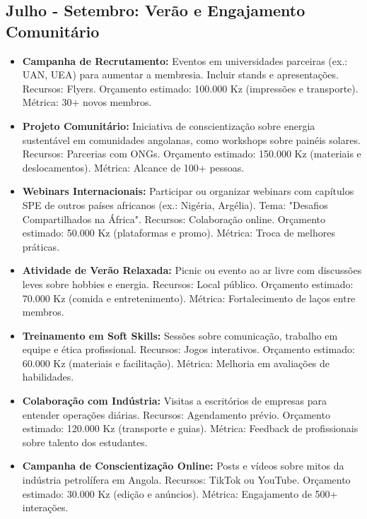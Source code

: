 \documentclass[12pt]{article}
\begin{document}
\subsection{Julho - Setembro: Verão e Engajamento Comunitário}
\begin{itemize}
    \item \textbf{Campanha de Recrutamento:} Eventos em universidades parceiras (ex.: UAN, UEA) para aumentar a membresia. Incluir stands e apresentações. Recursos: Flyers. Orçamento estimado: 100.000 Kz (impressões e transporte). Métrica: 30+ novos membros.
    \item \textbf{Projeto Comunitário:} Iniciativa de conscientização sobre energia sustentável em comunidades angolanas, como workshops sobre painéis solares. Recursos: Parcerias com ONGs. Orçamento estimado: 150.000 Kz (materiais e deslocamentos). Métrica: Alcance de 100+ pessoas.
    \item \textbf{Webinars Internacionais:} Participar ou organizar webinars com capítulos SPE de outros países africanos (ex.: Nigéria, Argélia). Tema: "Desafios Compartilhados na África". Recursos: Colaboração online. Orçamento estimado: 50.000 Kz (plataformas e promo). Métrica: Troca de melhores práticas.
    \item \textbf{Atividade de Verão Relaxada:} Picnic ou evento ao ar livre com discussões leves sobre hobbies e energia. Recursos: Local público. Orçamento estimado: 70.000 Kz (comida e entretenimento). Métrica: Fortalecimento de laços entre membros.
    \item \textbf{Treinamento em Soft Skills:} Sessões sobre comunicação, trabalho em equipe e ética profissional. Recursos: Jogos interativos. Orçamento estimado: 60.000 Kz (materiais e facilitação). Métrica: Melhoria em avaliações de habilidades.
    \item \textbf{Colaboração com Indústria:} Visitas a escritórios de empresas para entender operações diárias. Recursos: Agendamento prévio. Orçamento estimado: 120.000 Kz (transporte e guias). Métrica: Feedback de profissionais sobre talento dos estudantes.
    \item \textbf{Campanha de Conscientização Online:} Posts e vídeos sobre mitos da indústria petrolífera em Angola. Recursos: TikTok ou YouTube. Orçamento estimado: 30.000 Kz (edição e anúncios). Métrica: Engajamento de 500+ interações.
\end{itemize}
\end{document}
